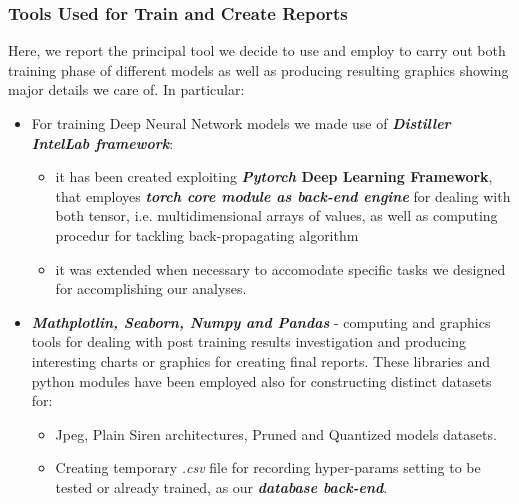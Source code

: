 




\begin{frame}
\frametitle{Tools Used for Train and Create Reports}
Here, we report the principal tool we decide to use and employ to carry out both training phase of different models as well as producing resulting graphics showing major details we care of. In particular:

\begin{itemize}
\item For training Deep Neural Network models we made use of \textbf{\textit{Distiller IntelLab framework}}:
\begin{itemize}
\item it has been created exploiting \textbf{\textit{Pytorch} Deep Learning Framework}, that employes \textbf{\textit{torch core module as back-end engine}} for dealing with both tensor,
i.e. multidimensional arrays of values, as well as computing procedur for tackling back-propagating algorithm
\item it was extended when necessary to accomodate specific tasks we designed for accomplishing our analyses.
\end{itemize}
\item \textbf{\textit{Mathplotlin, Seaborn, Numpy and Pandas}} - computing and graphics tools for dealing with post training results investigation and producing interesting
charts or graphics for creating final reports. These libraries and python modules have been employed also for constructing distinct datasets for:
\begin{itemize}
\item Jpeg, Plain Siren architectures, Pruned and Quantized models datasets.
\item Creating temporary \textit{.csv} file for recording hyper-params setting to be tested or already trained, as our \textbf{\textit{database back-end}}.
\end{itemize}


\end{itemize}
\end{frame}